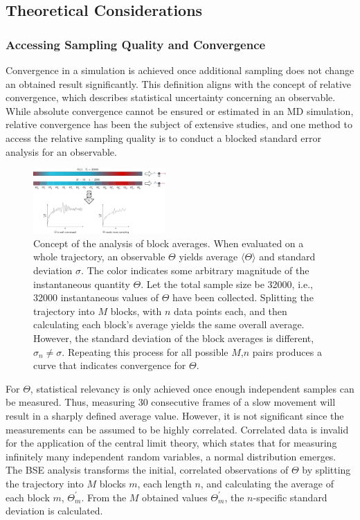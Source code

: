 \documentclass[9pt,tutorial]{livecoms}
\begin{document}
\subsection{Theoretical Considerations}
\subsubsection*{Accessing Sampling Quality and Convergence}
Convergence in a simulation is achieved once additional sampling does not change an obtained result significantly. This definition aligns with the concept of relative convergence, which describes statistical uncertainty concerning an observable. While absolute convergence cannot be ensured or estimated in an MD simulation, relative convergence has been the subject of extensive studies, and one method to access the relative sampling quality is to conduct a blocked standard error analysis for an observable.\cite{Grossfield_2009}\\
\begin{figure}[H]
    \centering
    \includegraphics[width=0.45\textwidth]{figures/bse_concept.png}
    \caption{Concept of the analysis of block averages. When evaluated on a whole trajectory, an observable $\Theta$ yields average $\langle \Theta \rangle$ and standard deviation $\sigma$. The color indicates some arbitrary magnitude of the instantaneous quantity $\Theta$. Let the total sample size be 32000, i.e., 32000 instantaneous values of $\Theta$ have been collected. Splitting the trajectory into $M$ blocks, with $n$ data points each, and then calculating each block's average yields the same overall average. However, the standard deviation of the block averages is different, $\sigma_n \neq \sigma$. Repeating this process for all possible $M$,$n$ pairs produces a curve that indicates convergence for $\Theta$.\cite{Grossfield_2009}}
    \label{fig:bseconcept}
\end{figure}
For $\Theta$, statistical relevancy is only achieved once enough independent samples can be measured. Thus, measuring 30 consecutive frames of a slow movement will result in a sharply defined average value. However, it is not significant since the measurements can be assumed to be highly correlated. Correlated data is invalid for the application of the central limit theory, which states that for measuring infinitely many independent random variables, a normal distribution emerges. The BSE analysis transforms the initial, correlated observations of $\Theta$ by splitting the trajectory into $M$ blocks $m$, each length $n$, and calculating the average of each block $m$, $\Theta^\prime_m$. From the $M$ obtained values $\Theta^\prime_m$, the $n$-specific standard deviation is calculated.
\end{document}
